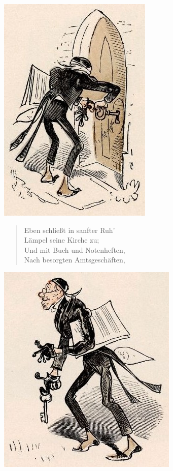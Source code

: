 \documentclass[a4paper,12pt]{article}
\begin{document}
\begin{center}\includegraphics[scale=.7, alt={an der Kirchentür}]{images/4-04.jpg}\end{center}



\begin{verse}
Eben schließt in sanfter Ruh'\\{}
Lämpel seine Kirche zu;\\{}
Und mit Buch und Notenheften,\\{}
Nach besorgten Amtsgeschäften,
\end{verse}



\begin{center}\includegraphics[scale=.7, alt={am Nachhauseweg}]{images/4-05.jpg}\end{center}
\end{document}
